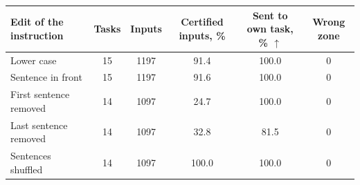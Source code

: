 \begin{tabular}{lccccc}
    \toprule
    Edit of the instruction & Tasks & Inputs & Certified inputs, \% & \shortstack[c]{Sent to own\\task, \% $\uparrow$} & Wrong zone \\
    \midrule
    Lower case & 15 & 1197 & 91.4 & 100.0 & 0 \\
    Sentence in front & 15 & 1197 & 91.6 & 100.0 & 0 \\
    First sentence removed & 14 & 1097 & 24.7 & 100.0 & 0 \\
    Last sentence removed & 14 & 1097 & 32.8 & 81.5 & 0 \\
    Sentences shuffled & 14 & 1097 & 100.0 & 100.0 & 0 \\
    \bottomrule
\end{tabular}
